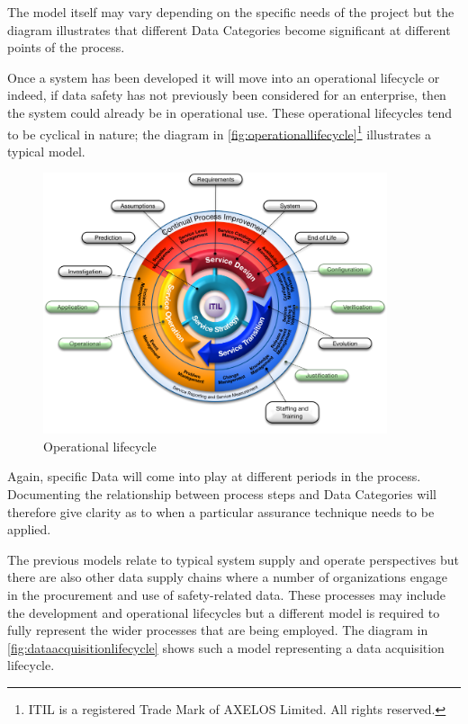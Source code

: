 The model itself may vary depending on the specific needs of the project but the diagram illustrates that different Data Categories become significant at different points of the process. 

 Once a system has been developed it will move into an operational lifecycle or indeed, if data safety has not previously been considered for an enterprise, then the system could already be in operational use. These operational lifecycles tend to be cyclical in nature; the diagram in \autoref{fig:operationallifecycle}\footnote{ITIL is a registered Trade Mark of AXELOS Limited. All rights reserved.} illustrates a typical model.

\begin{figure}[htbp]
  \centering
  \includegraphics[width=0.9\textwidth]{images/operationallifecycleflat}
  \caption{Operational lifecycle}
  \label{fig:operationallifecycle}
\end{figure}

Again, specific Data  will come into play at different periods in the process. Documenting the relationship between process steps and Data Categories will therefore give clarity as to when a particular assurance technique needs to be applied.

 The previous models relate to typical system supply and operate perspectives but there are also other data supply chains where a number of organizations engage in the procurement and use of safety-related data. These processes may include the development and operational lifecycles but a different model is required to fully represent the wider processes that are being employed. The diagram in \autoref{fig:dataacquisitionlifecycle} shows such a model representing a data acquisition lifecycle.

